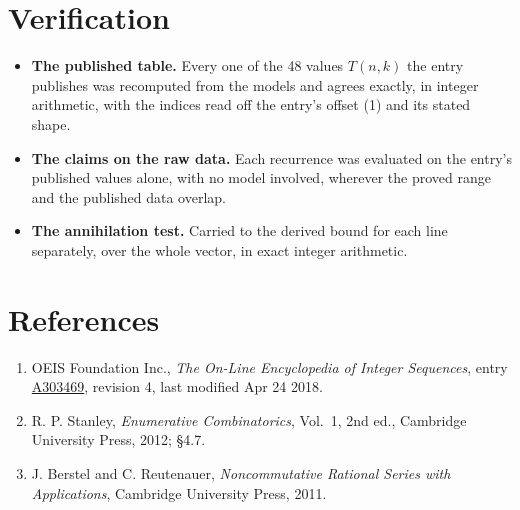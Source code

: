 \documentclass[11pt]{article}
\theoremstyle{definition}
\begin{document}
\section{Verification}

\begin{itemize}

\item {\bfseries The published table.} Every one of the 48 values $T(n,k)$ the entry publishes was recomputed from the models and agrees exactly, in integer arithmetic, with the indices read off the entry's offset (1) and its stated shape.

\item {\bfseries The claims on the raw data.} Each recurrence was evaluated on the entry's published values alone, with no model involved, wherever the proved range and the published data overlap.

\item {\bfseries The annihilation test.} Carried to the derived bound for each line separately, over the whole vector, in exact integer arithmetic.

\end{itemize}

\section{References}

\begin{enumerate}

\item OEIS Foundation Inc., \emph{The On-Line Encyclopedia of Integer Sequences}, entry \href{https://oeis.org/A303469}{A303469}, revision 4, last modified Apr 24 2018.

\item R. P. Stanley, \emph{Enumerative Combinatorics}, Vol.~1, 2nd ed., Cambridge University Press, 2012; \S4.7.

\item J. Berstel and C. Reutenauer, \emph{Noncommutative Rational Series with Applications}, Cambridge University Press, 2011.

\end{enumerate}
\end{document}
